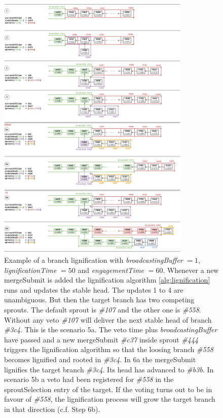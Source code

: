 \begin{figure}[h!]
  \begin{center}
    \includegraphics[width=0.82\textwidth]{src/img/LignificationProcessV7.png}
\end{center}
 \caption{Example of a branch lignification with \textit{broadcastingBuffer} $=1$, \textit{lignificationTime} $=50$ and \textit{engagementTime} $=60$. Whenever a new mergeSubmit is added the lignification algorithm \ref{alg:lignification} runs and updates the stable head. The updates 1 to 4 are unambiguous. But then the target branch has two competing sprouts. The default sprout is \textit{\#107} and the other one is \textit{\#558}. Without any veto \textit{\#107} will deliver the next stable head of branch \textit{\#3c4}. This is the scenario 5a. The veto time plus \textit{broadcastingBuffer} have passed and a new mergeSubmit \textit{\#c37} inside sprout \textit{\#444} triggers the lignification algorithm so that the loosing branch \textit{\#558} becomes lignified and rooted in \textit{\#3c4}. In 6a the mergeSubmit lignifies the target branch \textit{\#3c4}. Its head has advanced to \textit{\#b3b}. In scenario 5b a veto had been registered for \textit{\#558} in the sproutSelection entry of the target. If the voting turns out to be in favour of \textit{\#558}, the lignification process will grow the target branch in that direction (c.f. Step 6b).}
 \label{fig:bufferbranches}
\end{figure}


